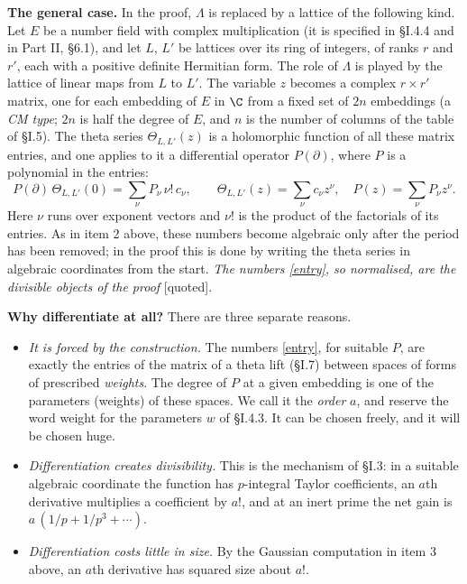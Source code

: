 \documentclass[11pt,letterpaper]{article}
\newcommand{\quoted}{\textsf{[quoted]}}
\begin{document}
\textbf{The general case.} In the proof, $\Lambda$ is replaced by a lattice of the following kind. Let $E$ be
a number field with complex multiplication (it is specified in \S I.4.4 and in Part II, \S6.1), and let $L$,
$L'$ be lattices over its ring of integers, of ranks $r$ and $r'$, each with a positive definite Hermitian
form. The role of
$\Lambda$ is played by the lattice of linear maps from $L$ to $L'$. The variable $z$ becomes a complex
$r\times r'$ matrix, one for each embedding of $E$ in $\C$ from a fixed set of $2n$ embeddings (a \emph{CM
type}; $2n$ is half the degree of $E$, and $n$ is the number of columns of the table of \S I.5). The theta series $\Theta_{L,L'}(z)$ is a holomorphic function of
all these matrix entries, and one applies to it a differential operator $P(\partial)$, where $P$ is a
polynomial in the entries:
\begin{equation}\label{entry}
 P(\partial)\,\Theta_{L,L'}(0)=\sum_\nu P_\nu\,\nu!\,c_\nu,\qquad
 \Theta_{L,L'}(z)=\sum_\nu c_\nu z^\nu,\quad P(z)=\sum_\nu P_\nu z^\nu .
\end{equation}
Here $\nu$ runs over exponent vectors and $\nu!$ is the product of the factorials of its entries. As in
item 2 above, these numbers become algebraic only after the period has been removed; in the proof this is
done by writing the theta series in algebraic coordinates from the start.
\emph{The numbers \eqref{entry}, so normalised, are the divisible objects of the proof} \quoted.

\textbf{Why differentiate at all?} There are three separate reasons.
\begin{itemize}
\item \emph{It is forced by the construction.} The numbers \eqref{entry}, for suitable $P$, are exactly the
entries of the matrix of a theta lift (\S I.7) between spaces of forms of prescribed \emph{weights}. The
degree of $P$ at a given embedding is one of the parameters (weights) of these spaces. We call it the
\emph{order} $a$, and reserve the word weight for the parameters $w$ of \S I.4.3. It can be chosen
freely, and it will be chosen huge.
\item \emph{Differentiation creates divisibility.} This is the mechanism of \S I.3: in a suitable algebraic
coordinate the function has $p$-integral Taylor coefficients, an $a$th derivative multiplies a coefficient
by $a!$, and at an inert prime the net gain is $a\,(1/p+1/p^3+\cdots)$.
\item \emph{Differentiation costs little in size.} By the Gaussian computation in item 3 above, an $a$th
derivative has squared size about $a!$.
\end{itemize}
\end{document}
